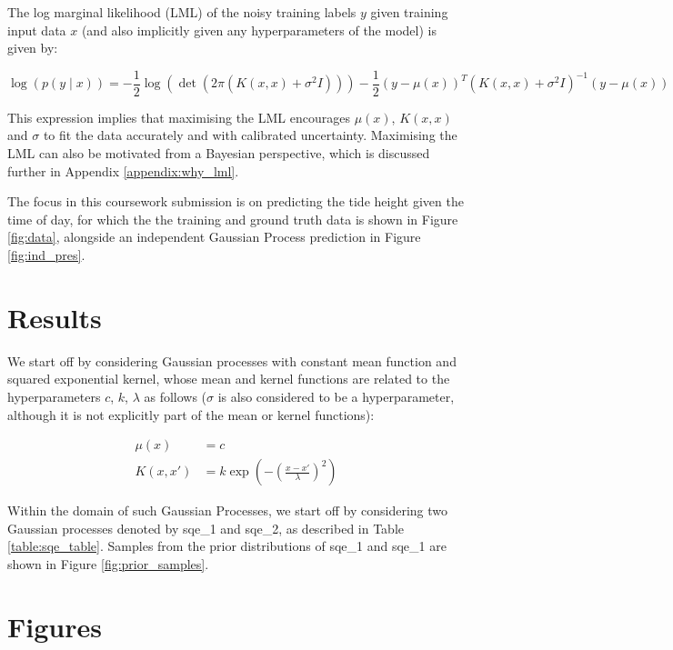 \documentclass{article}
\begin{document}
The log marginal likelihood (LML) of the noisy training labels $y$ given training input data $x$ (and also implicitly given any hyperparameters of the model) is given by:

\begin{equation}
    \log \left( p(y \mid x) \right) = -\frac{1}{2}\log\left(\det \left(2\pi\left( K(x, x) + \sigma^2 I \right)\right)\right) -\frac{1}{2}(y - \mu(x))^T \left( K(x, x) + \sigma^2 I \right)^{-1} (y - \mu(x))
\end{equation}

This expression implies that maximising the LML encourages $\mu(x)$, $K(x,x)$ and $\sigma$ to fit the data accurately and with calibrated uncertainty. Maximising the LML can also be motivated from a Bayesian perspective, which is discussed further in Appendix \ref{appendix:why_lml}.

The focus in this coursework submission is on predicting the tide height given the time of day, for which the the training and ground truth data is shown in Figure \ref{fig:data}, alongside an independent Gaussian Process prediction in Figure \ref{fig:ind_pres}.

\section{Results}

We start off by considering Gaussian processes with constant mean function and squared exponential kernel, whose mean and kernel functions are related to the hyperparameters $c$, $k$, $\lambda$ as follows ($\sigma$ is also considered to be a hyperparameter, although it is not explicitly part of the mean or kernel functions):

\begin{align}
\mu(x) &= c \\
K(x, x') &= k \exp\left( -\left( \frac{x - x'}{\lambda} \right)^2 \right)
\end{align}

Within the domain of such Gaussian Processes, we start off by considering two Gaussian processes denoted by sqe\_1 and sqe\_2, as described in Table \ref{table:sqe_table}. Samples from the prior distributions of sqe\_1 and sqe\_1 are shown in Figure \ref{fig:prior_samples}.


\appendix

\section{Figures}\label{appendix:figures}
\end{document}

